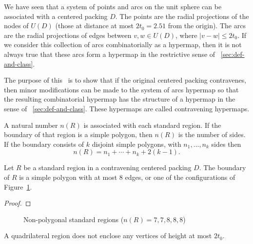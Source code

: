 
We have seen that a system of points and arcs on the unit sphere
can be associated with a centered packing $D$.  The points are the
radial projections of the nodes of $U(D)$ (those at distance at
most $2t_0=2.51$ from the origin).  The arcs are the radial
projections of edges between $v,w\in U(D)$, where $|v-w|\le2t_0$.
If we consider this collection of arcs combinatorially as a
hypermap, then it is not always true that these arcs form a
hypermap in the restrictive sense of
\Chap~\ref{sec:def-and-class}.

The purpose of this \chap\ is to show that if the original
centered packing contravenes, then minor modifications can be made
to the system of arcs hypermap so that the resulting combinatorial
hypermap has the structure of a hypermap in the sense of
\Chap~\ref{sec:def-and-class}. These hypermaps are called
contravening hypermaps.

A natural number $n(R)$ is associated with each standard region. If
the boundary of that region is a simple polygon, then $n(R)$ is the
number of sides.   If the boundary consists of $k$ disjoint simple
polygons, with $n_1,\ldots,n_k$ sides then
    $$n(R) = n_1+\cdots+n_k + 2(k-1).$$

\begin{lemma}\label{cor:std-aggregate-list:bis}
Let $R$ be a standard region in a contravening centered packing
$D$.  The boundary of $R$ is a simple polygon with at most $8$
edges, or one of the configurations of
Figure~\ref{fig:aggregates}.
\end{lemma}

\begin{proof} 
\end{proof}

\begin{figure}[htb]
  \centering
  \caption{Non-polygonal standard regions ($n(R)=7,7,8,8,8$)}
  \label{fig:aggregates}
\end{figure}

\begin{lemma}\label{lemma:enclosed:bis} %
A quadrilateral region does not enclose any vertices of height at
most $2t_0$.
\end{lemma}


